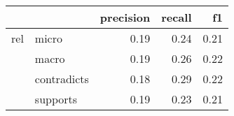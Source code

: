 \begin{tabular}{llrrr}
\toprule
    &          &  precision &  recall &   f1 \\
\midrule
rel & micro &       0.19 &    0.24 & 0.21 \\
    & macro &       0.19 &    0.26 & 0.22 \\
    & contradicts &       0.18 &    0.29 & 0.22 \\
    & supports &       0.19 &    0.23 & 0.21 \\
\bottomrule
\end{tabular}
